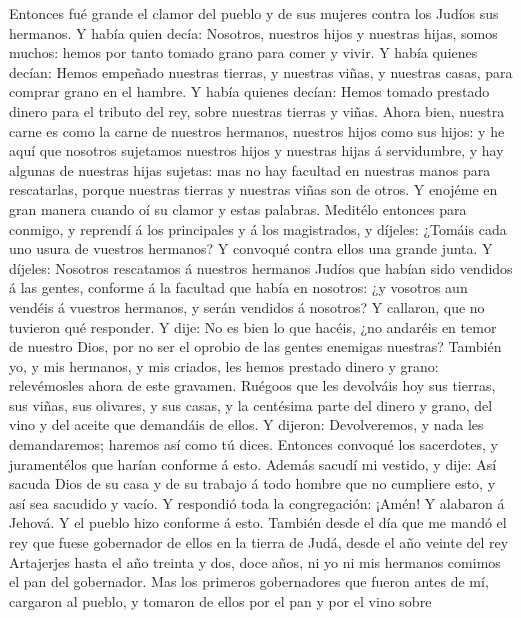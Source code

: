  Entonces fué grande el clamor del pueblo y de sus mujeres
contra los Judíos sus hermanos.  Y había quien decía:
Nosotros, nuestros hijos y nuestras hijas, somos muchos: hemos por tanto
tomado grano para comer y vivir.  Y había quienes decían:
Hemos empeñado nuestras tierras, y nuestras viñas, y nuestras casas,
para comprar grano en el hambre.  Y había quienes decían:
Hemos tomado prestado dinero para el tributo del rey, sobre nuestras
tierras y viñas.  Ahora bien, nuestra carne es como la carne
de nuestros hermanos, nuestros hijos como sus hijos: y he aquí que
nosotros sujetamos nuestros hijos y nuestras hijas á servidumbre, y hay
algunas de nuestras hijas sujetas: mas no hay facultad en nuestras manos
para rescatarlas, porque nuestras tierras y nuestras viñas son de otros.
 Y enojéme en gran manera cuando oí su clamor y estas
palabras.  Meditélo entonces para conmigo, y reprendí á los
principales y á los magistrados, y díjeles: ¿Tomáis cada uno usura de
vuestros hermanos? Y convoqué contra ellos una grande junta.
 Y díjeles: Nosotros rescatamos á nuestros hermanos Judíos
que habían sido vendidos á las gentes, conforme á la facultad que había
en nosotros: ¿y vosotros aun vendéis á vuestros hermanos, y serán
vendidos á nosotros? Y callaron, que no tuvieron qué responder.
 Y dije: No es bien lo que hacéis, ¿no andaréis en temor de
nuestro Dios, por no ser el oprobio de las gentes enemigas nuestras?
 También yo, y mis hermanos, y mis criados, les hemos
prestado dinero y grano: relevémosles ahora de este gravamen.
 Ruégoos que les devolváis hoy sus tierras, sus viñas, sus
olivares, y sus casas, y la centésima parte del dinero y grano, del vino
y del aceite que demandáis de ellos.  Y dijeron:
Devolveremos, y nada les demandaremos; haremos así como tú dices.
Entonces convoqué los sacerdotes, y juramentélos que harían conforme á
esto.  Además sacudí mi vestido, y dije: Así sacuda Dios de
su casa y de su trabajo á todo hombre que no cumpliere esto, y así sea
sacudido y vacío. Y respondió toda la congregación: ¡Amén! Y alabaron á
Jehová. Y el pueblo hizo conforme á esto.  También desde el
día que me mandó el rey que fuese gobernador de ellos en la tierra de
Judá, desde el año veinte del rey Artajerjes hasta el año treinta y dos,
doce años, ni yo ni mis hermanos comimos el pan del gobernador.
 Mas los primeros gobernadores que fueron antes de mí,
cargaron al pueblo, y tomaron de ellos por el pan y por el vino sobre
